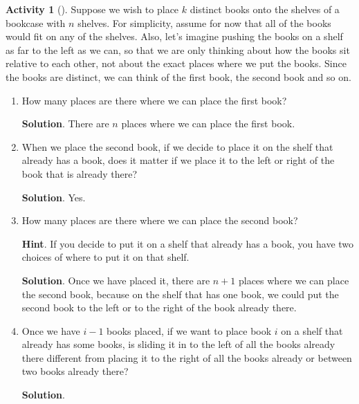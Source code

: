 \documentclass[10pt,]{book}
\theoremstyle{plain}
\theoremstyle{definition}
\theoremstyle{definition}
\theoremstyle{definition}
\newtheorem{activity}[project]{Activity}
\theoremstyle{definition}
\numberwithin{equation}{chapter}
\begin{document}
\begin{activity}[]\label{bookcase}
\hypertarget{p-731}{}%
Suppose we wish to place \(k\) distinct books onto the shelves of a bookcase with \(n\) shelves. For simplicity, assume for now that all of the books would fit on any of the shelves. Also, let's imagine pushing the books on a shelf as far to the left as we can, so that we are only thinking about how the books sit relative to each other, not about the exact places where we put the books. Since the books are distinct, we can think of the first book, the second book and so on.%
\begin{enumerate}[font=\bfseries,label=(\alph*),ref=\alph*]
\item\label{task-92} \hypertarget{p-732}{}%
How many places are there where we can place the first book?%
\par\smallskip%
\noindent\textbf{Solution}.\hypertarget{solution-64}{}\quad%
\hypertarget{p-733}{}%
There are \(n\) places where we can place the first book.%
\item\label{task-93} \hypertarget{p-734}{}%
When we place the second book, if we decide to place it on the shelf that already has a book, does it matter if we place it to the left or right of the book that is already there?%
\par\smallskip%
\noindent\textbf{Solution}.\hypertarget{solution-65}{}\quad%
\hypertarget{p-735}{}%
Yes.%
\item\label{task-94} \hypertarget{p-736}{}%
How many places are there where we can place the second book?%
\par\smallskip%
\noindent\textbf{Hint}.\hypertarget{hint-57}{}\quad%
\hypertarget{p-737}{}%
If you decide to put it on a shelf that already has a book, you have two choices of where to put it on that shelf.%
\par\smallskip%
\noindent\textbf{Solution}.\hypertarget{solution-66}{}\quad%
\hypertarget{p-738}{}%
Once we have placed it, there are \(n+1\) places where we can place the second book, because on the shelf that has one book, we could put the second book to the left or to the right of the book already there.%
\item\label{task-95} \hypertarget{p-739}{}%
Once we have \(i-1\) books placed, if we want to place book \(i\)  on a shelf that already has some books, is sliding it in to the left of all the books already there different from placing it to the right of all the books already or between two books already there?%
\par\smallskip%
\noindent\textbf{Solution}.\hypertarget{solution-67}{}\quad%

\end{enumerate}
\end{activity}
\end{document}
